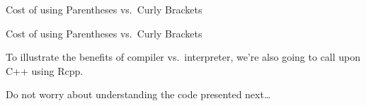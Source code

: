 \begin{frame}[fragile]{Cost of using Parentheses vs.~Curly Brackets}

\begin{Shaded}
\begin{Highlighting}[]
\StringTok{ }\NormalTok{/(}
\StringTok{ }\NormalTok{/(}
\StringTok{ }\NormalTok{)}
\StringTok{ }\NormalTok{/\{}
\StringTok{ }\NormalTok{/\{}
\end{Highlighting}
\end{Shaded}

\end{frame}

\begin{frame}[fragile]{Cost of using Parentheses vs.~Curly Brackets}

To illustrate the benefits of compiler vs.~interpreter, we're also going
to call upon C++ using Rcpp.

Do not worry about understanding the code presented next\ldots{}

\begin{Shaded}
\begin{Highlighting}[]

\NormalTok{(}
\NormalTok{)}
\end{Highlighting}
\end{Shaded}

\end{frame}

